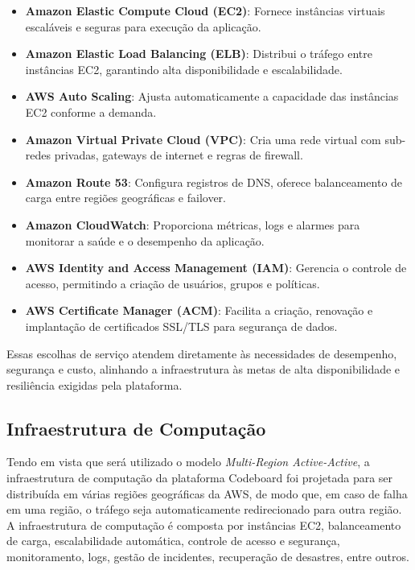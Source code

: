 \begin{itemize}
    \item \textbf{Amazon Elastic Compute Cloud (EC2)}: Fornece instâncias virtuais escaláveis e seguras para execução da aplicação.
    \item \textbf{Amazon Elastic Load Balancing (ELB)}: Distribui o tráfego entre instâncias EC2, garantindo alta disponibilidade e escalabilidade.
    \item \textbf{AWS Auto Scaling}: Ajusta automaticamente a capacidade das instâncias EC2 conforme a demanda.
    \item \textbf{Amazon Virtual Private Cloud (VPC)}: Cria uma rede virtual com sub-redes privadas, gateways de internet e regras de firewall.
    \item \textbf{Amazon Route 53}: Configura registros de DNS, oferece balanceamento de carga entre regiões geográficas e failover.
    \item \textbf{Amazon CloudWatch}: Proporciona métricas, logs e alarmes para monitorar a saúde e o desempenho da aplicação.
    \item \textbf{AWS Identity and Access Management (IAM)}: Gerencia o controle de acesso, permitindo a criação de usuários, grupos e políticas.
    \item \textbf{AWS Certificate Manager (ACM)}: Facilita a criação, renovação e implantação de certificados SSL/TLS para segurança de dados.
\end{itemize}

Essas escolhas de serviço atendem diretamente às necessidades de desempenho, segurança e custo, alinhando a infraestrutura às metas de alta disponibilidade e resiliência exigidas pela plataforma.


\subsection{Infraestrutura de Computação}

Tendo em vista que será utilizado o modelo \emph{Multi-Region Active-Active}, a infraestrutura de computação da plataforma Codeboard foi projetada para ser distribuída em várias regiões geográficas da AWS, de modo que, em caso de falha em uma região, o tráfego seja automaticamente redirecionado para outra região. A infraestrutura de computação é composta por instâncias EC2, balanceamento de carga, escalabilidade automática, controle de acesso e segurança, monitoramento, logs, gestão de incidentes, recuperação de desastres, entre outros.

